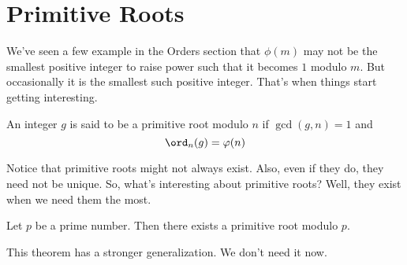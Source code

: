 \documentclass[11pt]{scrartcl}
\begin{document}
\section{Primitive Roots}
We've seen a few example in the Orders section that \(\phi(m)\) may not be the smallest positive integer to raise power such that it becomes \(1\) modulo \(m\). But occasionally it is the smallest such positive integer. That's when things start getting interesting.
\begin{defn}
An integer \(g\) is said to be a primitive root modulo \(n\) if \(\gcd(g,n) = 1\) and \[\ord_n(g) = \varphi(n)\]
\end{defn}
Notice that primitive roots might not always exist. Also, even if they do, they need not be unique. So, what's interesting about primitive roots? Well, they exist when we need them the most.
\begin{theorem}
Let \(p\) be a prime number. Then there exists a primitive root modulo \(p\).
\end{theorem}
This theorem has a stronger generalization. We don't need it now.
\end{document}
